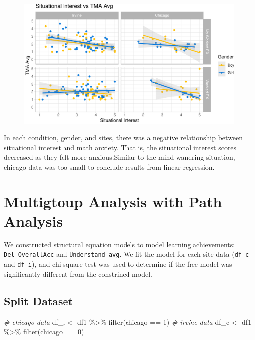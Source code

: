 \documentclass[
  letterpaper,
  DIV=11,
  numbers=noendperiod]{scrartcl}
\newenvironment{Shaded}{\begin{snugshade}}{\end{snugshade}}
\newcommand{\CommentTok}[1]{\textcolor[rgb]{0.38,0.63,0.69}{\textit{#1}}}
\newcommand{\DecValTok}[1]{\textcolor[rgb]{0.25,0.63,0.44}{#1}}
\newcommand{\FunctionTok}[1]{\textcolor[rgb]{0.02,0.16,0.49}{#1}}
\newcommand{\NormalTok}[1]{\textcolor[rgb]{0.00,0.44,0.13}{#1}}
\newcommand{\OtherTok}[1]{\textcolor[rgb]{0.00,0.44,0.13}{#1}}
\newcommand{\SpecialCharTok}[1]{\textcolor[rgb]{0.25,0.44,0.63}{#1}}
\begin{document}
\begin{figure}[H]

{\centering \includegraphics{sampling_files/figure-pdf/unnamed-chunk-23-1.pdf}

}

\end{figure}

In each condition, gender, and sites, there was a negative relationship
between situational interest and math anxiety. That is, the situational
interest scores decreased as they felt more anxious.Similar to the mind
wandring situation, chicago data was too small to conclude results from
linear regression.

\hypertarget{multigtoup-analysis-with-path-analysis}{%
\section{Multigtoup Analysis with Path
Analysis}\label{multigtoup-analysis-with-path-analysis}}

We constructed structural equation models to model learning
achievements: \texttt{Del\_OverallAcc} and \texttt{Understand\_avg}. We
fit the model for each site data (\texttt{df\_c} and \texttt{df\_i}),
and chi-square test was used to determine if the free model was
significantly different from the constrined model.

\hypertarget{split-dataset}{%
\subsection{Split Dataset}\label{split-dataset}}

\begin{Shaded}
\begin{Highlighting}[]
\CommentTok{\# chicago data}
\NormalTok{df\_i }\OtherTok{\textless{}{-}}\NormalTok{ df1 }\SpecialCharTok{\%\textgreater{}\%} \FunctionTok{filter}\NormalTok{(chicago }\SpecialCharTok{==} \DecValTok{1}\NormalTok{)}
\CommentTok{\# irvine data}
\NormalTok{df\_c }\OtherTok{\textless{}{-}}\NormalTok{ df1 }\SpecialCharTok{\%\textgreater{}\%} \FunctionTok{filter}\NormalTok{(chicago }\SpecialCharTok{==} \DecValTok{0}\NormalTok{)}
\end{Highlighting}
\end{Shaded}
\end{document}
